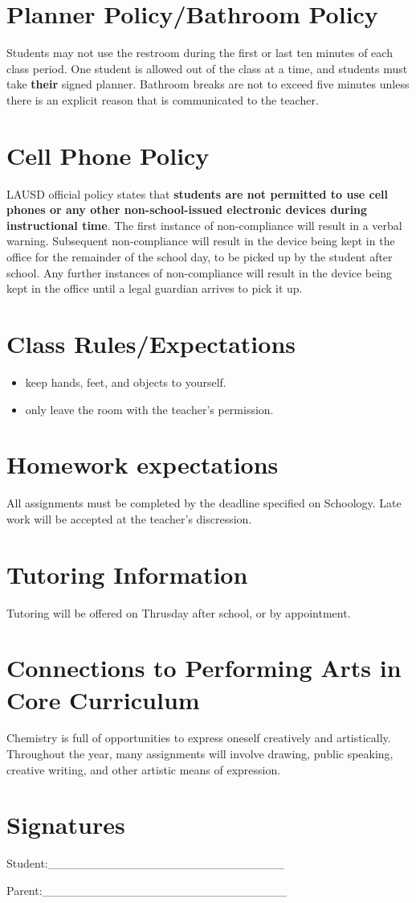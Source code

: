 \documentclass[11pt]{article}
\begin{document}
\section{Planner Policy/Bathroom Policy}
\label{sec:org35ef53c}
Students may not use the restroom during the first or last ten minutes of each class period. One student is allowed out of the class at a time, and students must take \textbf{\textbf{their}} signed planner. Bathroom breaks are not to exceed five minutes unless there is an explicit reason that is communicated to the teacher.
\section{Cell Phone Policy}
\label{sec:org6f563b5}
LAUSD official policy states that \textbf{\textbf{students are not permitted to use cell phones or any other non-school-issued electronic devices during instructional time}}. The first instance of non-compliance will result in a verbal warning. Subsequent non-compliance will result in  the device being kept in the office for the remainder of the school day, to be picked up by the student after school. Any further instances of non-compliance will result in the device being kept in the office until a legal guardian arrives to pick it up.
\section{Class Rules/Expectations}
\label{sec:org7c59aff}
\begin{itemize}
\item keep hands, feet, and objects to yourself.
\item only leave the room with the teacher's permission.
\end{itemize}
\section{Homework expectations}
\label{sec:orgfb791c0}
All assignments must be completed by the deadline specified on Schoology. Late work will be accepted at the teacher's discression. 
\section{Tutoring Information}
\label{sec:org008d2f6}
Tutoring will be offered on Thrusday after school, or by appointment.
\section{Connections to Performing Arts in Core Curriculum}
\label{sec:orgae43c53}
Chemistry is full of opportunities to express oneself creatively and artistically. Throughout the year, many assignments will involve drawing, public speaking, creative writing, and other artistic means of expression.

\section{Signatures}
\label{sec:orgfc1a8fb}

Student:\_\_\_\_\_\_\_\_\_\_\_\_\_\_\_\_\_\_\_\_\_\_\_\_\_\_\_\_


Parent:\_\_\_\_\_\_\_\_\_\_\_\_\_\_\_\_\_\_\_\_\_\_\_\_\_\_\_\_\_
\end{document}
